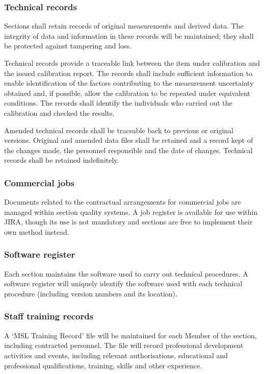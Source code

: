 \subsubsection{Technical records}
Sections shall retain records of original measurements and derived data. The integrity of data and information in these records will be maintained; they shall be protected against tampering and loss.

Technical records provide a traceable link between the item under calibration and the issued calibration report. The records shall include sufficient information to enable identification of the factors contributing to the measurement uncertainty obtained and, if possible, allow the calibration to be repeated under equivalent conditions. The records shall identify the individuals who carried out the calibration and checked the results. 

Amended technical records shall be traceable back to previous or original versions. Original and amended data files shall be retained and a record kept of the changes made, the personnel responsible and the date of changes.
Technical records shall be retained indefinitely.

\subsubsection{Commercial jobs}

Documents related to the contractual arrangements for commercial jobs are managed within section quality systems. A job register is available for use within JIRA, though its use is not mandatory and sections are free to implement their own method instead.


\subsubsection{Software register}
Each section maintains the software used to carry out technical procedures. 
A software register will uniquely identify the software used with each technical procedure (including version numbers and its location). 

\subsubsection{Staff training records}
\label{sss:training_records}
A `MSL Training Record' file will be maintained for each Member of the section, including contracted personnel.  The file will record professional development activities and events, including relevant authorisations, educational and professional qualifications, training, skills and other experience.

